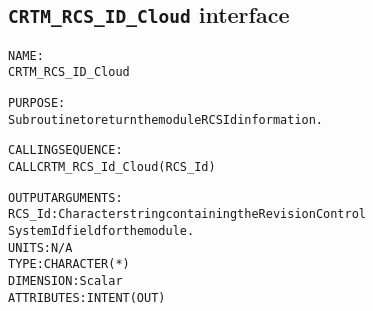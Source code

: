 \subsection{\texttt{CRTM\_RCS\_ID\_Cloud} interface}
  \label{sec:CRTM_RCS_ID_Cloud_interface}
  \begin{alltt}
 
  NAME:
        CRTM_RCS_ID_Cloud
 
  PURPOSE:
        Subroutine to return the module RCS Id information.
 
  CALLING SEQUENCE:
        CALL CRTM_RCS_Id_Cloud( RCS_Id )
 
  OUTPUT ARGUMENTS:
        RCS_Id:        Character string containing the Revision Control
                       System Id field for the module.
                       UNITS:      N/A
                       TYPE:       CHARACTER(*)
                       DIMENSION:  Scalar
                       ATTRIBUTES: INTENT(OUT)
 
  \end{alltt}
